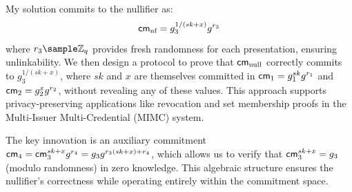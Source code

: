 My solution commits to the nullifier as:
\[
\mathsf{cm}_{\text{nf}} = g_3^{1/(sk + x)} g^{r_3}
\]
where $r_3 \sample \mathbb{Z}_q$ provides fresh randomness for each presentation, ensuring unlinkability. We then design a protocol to prove that $\mathsf{cm}_{\text{null}}$ correctly commits to $g_3^{1/(sk + x)}$, where $sk$ and $x$ are themselves committed in $\mathsf{cm}_1 = g_1^{sk} g^{r_1}$ and $\mathsf{cm}_2 = g_2^{x} g^{r_2}$, without revealing any of these values. This approach supports privacy-preserving applications like revocation and set membership proofs in the Multi-Issuer Multi-Credential (MIMC) system.

The key innovation is an auxiliary commitment $\mathsf{cm}_4 = \mathsf{cm}_3^{sk + x} g^{r_4} = g_3 g^{r_3 (sk + x) + r_4}$, which allows us to verify that $\mathsf{cm}_3^{sk + x} = g_3$ (modulo randomness) in zero knowledge. This algebraic structure ensures the nullifier’s correctness while operating entirely within the commitment space.

